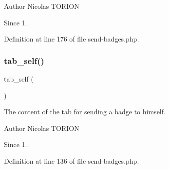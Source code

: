\begin{DoxyAuthor}{Author}
Nicolas T\+O\+R\+I\+ON 
\end{DoxyAuthor}
\begin{DoxySince}{Since}
1.. 
\end{DoxySince}


Definition at line 176 of file send-\/badges.\+php.

\mbox{\label{send-badges_8php_a31382084e2c0ab850e695b2963199fe9}} 
\subsubsection{\texorpdfstring{tab\+\_\+self()}{tab\_self()}}
{\footnotesize\ttfamily tab\+\_\+self (\begin{DoxyParamCaption}{ }\end{DoxyParamCaption})}

The content of the tab for sending a badge to himself.

\begin{DoxyAuthor}{Author}
Nicolas T\+O\+R\+I\+ON 
\end{DoxyAuthor}
\begin{DoxySince}{Since}
1.. 
\end{DoxySince}


Definition at line 136 of file send-\/badges.\+php.


